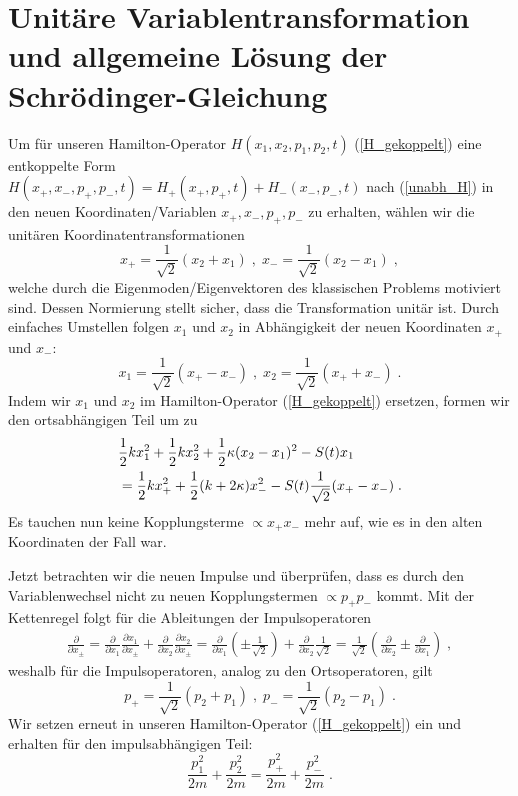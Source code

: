 \section{Unitäre Variablentransformation und allgemeine Lösung der Schrödinger-Gleichung}
  Um für unseren Hamilton-Operator $H(x_1,x_2,p_1,p_2,t)$ (\ref{H_gekoppelt}) eine entkoppelte Form \\
  $H(x_+,x_-,p_+,p_-,t)=H_+(x_+,p_+,t)+H_-(x_-,p_-,t)$ nach (\ref{unabh_H}) in den neuen Koordinaten/Variablen $x_+,x_-,p_+,p_-$ zu erhalten, wählen wir die unitären Koordinatentransformationen~\cite{arxiv}
  \begin{equation}
    x_+ = \frac{1}{\sqrt{2}}(x_2+x_1) \;,\; x_-=\frac{1}{\sqrt{2}}(x_2-x_1) \;,
    \label{koord_trafo_x}
  \end{equation}
  welche durch die Eigenmoden/Eigenvektoren des klassischen Problems motiviert sind.
  Dessen Normierung stellt sicher, dass die Transformation unitär ist.
  Durch einfaches Umstellen folgen $x_1$ und $x_2$ in Abhängigkeit der neuen Koordinaten $x_+$ und $x_-$:
  \begin{equation}
    x_1=\frac{1}{\sqrt{2}}(x_+-x_-) \;,\; x_2=\frac{1}{\sqrt{2}}(x_++x_-) \; .
  \end{equation}
  Indem wir $x_1$ und $x_2$ im Hamilton-Operator (\ref{H_gekoppelt}) ersetzen, formen wir den ortsabhängigen Teil um zu
  \begin{align}
    &\frac{1}{2}kx_1^2+\frac{1}{2}kx_2^2+\frac{1}{2}\kappa(x_2-x_1)^2-S(t)x_1 \notag\\
    &=\frac{1}{2}kx_+^2+\frac{1}{2}(k+2\kappa)x_-^2-S(t)\frac{1}{\sqrt{2}}(x_+-x_-) \; .
  \end{align}
  Es tauchen nun keine Kopplungsterme $\propto x_+x_-$ mehr auf, wie es in den alten Koordinaten der Fall war.

  Jetzt betrachten wir die neuen Impulse und überprüfen, dass es durch den Variablenwechsel nicht zu neuen Kopplungstermen $\propto p_+$$p_-$ kommt.
  Mit der Kettenregel folgt für die Ableitungen der Impulsoperatoren
  \begin{align}
    \frac{\partial}{\partial x_{\pm}} = \frac{\partial}{\partial x_1}\frac{\partial x_1}{\partial x_{\pm}} + \frac{\partial}{\partial x_2}\frac{\partial x_2}{\partial x_{\pm}}
    =\frac{\partial}{\partial x_1}\left(\pm\frac{1}{\sqrt{2}}\right)
    + \frac{\partial}{\partial x_2}\frac{1}{\sqrt{2}}
    = \frac{1}{\sqrt{2}}\left(\frac{\partial}{\partial x_2}\pm\frac{\partial}{\partial  x_1}\right) \;,
  \end{align}
  weshalb für die Impulsoperatoren, analog zu den Ortsoperatoren, gilt
  \begin{equation}
    p_+ = \frac{1}{\sqrt{2}}(p_2+p_1) \;,\; p_-=\frac{1}{\sqrt{2}}(p_2-p_1) \; .
    \label{koord_trafo_p}
  \end{equation}
  Wir setzen erneut in unseren Hamilton-Operator (\ref{H_gekoppelt}) ein und erhalten für den impulsabhängigen Teil:
  \begin{equation}
    \frac{p_1^2}{2m} + \frac{p_2^2}{2m} = \frac{p_+^2}{2m} + \frac{p_-^2}{2m} \; .
    \label{koord_trafo_p^2}
  \end{equation}


